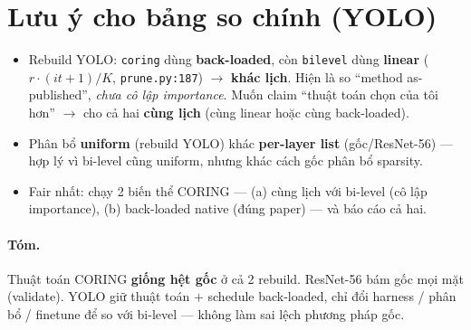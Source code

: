 \documentclass[11pt,a4paper]{article}
\newcommand{\code}[1]{\texttt{#1}}
\begin{document}
\section{Lưu ý cho bảng so chính (YOLO)}
\begin{itemize}
  \item Rebuild YOLO: \code{coring} dùng \textbf{back-loaded}, còn \code{bilevel} dùng \textbf{linear}
        ($r\cdot(it{+}1)/K$, \code{prune.py:187}) $\rightarrow$ \textbf{khác lịch}. Hiện là so
        ``method as-published'', \emph{chưa cô lập importance}. Muốn claim ``thuật toán chọn của tôi
        hơn'' $\rightarrow$ cho cả hai \textbf{cùng lịch} (cùng linear hoặc cùng back-loaded).
  \item Phân bổ \textbf{uniform} (rebuild YOLO) khác \textbf{per-layer list} (gốc/ResNet-56) --- hợp lý
        vì bi-level cũng uniform, nhưng khác cách gốc phân bổ sparsity.
  \item Fair nhất: chạy 2 biến thể CORING --- (a) cùng lịch với bi-level (cô lập importance),
        (b) back-loaded native (đúng paper) --- và báo cáo cả hai.
\end{itemize}

\paragraph{Tóm.} Thuật toán CORING \textbf{giống hệt gốc} ở cả 2 rebuild. ResNet-56 bám gốc mọi mặt
(validate). YOLO giữ thuật toán $+$ schedule back-loaded, chỉ đổi harness / phân bổ / finetune để so
với bi-level --- không làm sai lệch phương pháp gốc.
\end{document}
